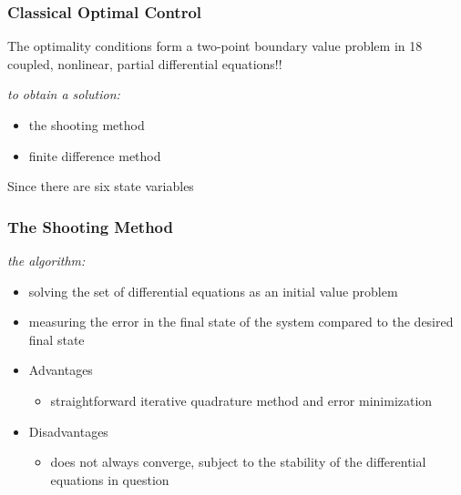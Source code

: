 \documentclass{beamer}
\begin{document}

\begin{frame}
\frametitle{Classical Optimal Control}

The optimality conditions form a two-point boundary value problem in 18 coupled, nonlinear, partial differential equations!!

\textit{to obtain a solution:}

\begin{itemize}
	\item the shooting method
	\item finite difference method
\end{itemize}

Since there are six state variables

\end{frame}




\begin{frame}
\frametitle{The Shooting Method}

\textit{the algorithm:}

\begin{itemize}
\item solving the set of differential equations as an initial value problem

\item measuring the error in the final state of the system compared to the desired final state

\item Advantages
    \begin{itemize}
        \item straightforward iterative quadrature method and error minimization
    \end{itemize}
\item Disadvantages
    \begin{itemize}
        \item does not always converge, subject to the stability of the differential equations in question
    \end{itemize}
\end{itemize}

\end{frame}



\end{document}
